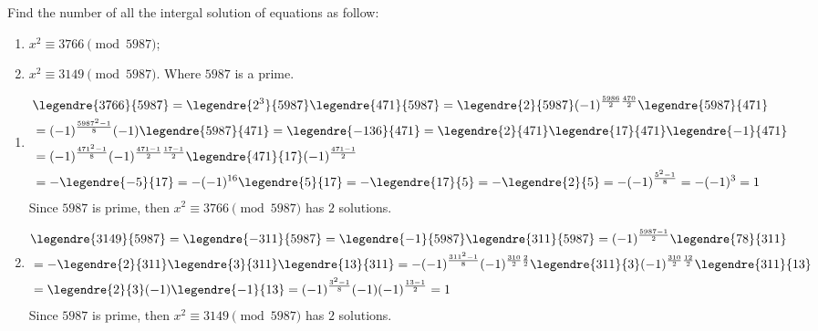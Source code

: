 \documentclass{ctexart}
\newif\ifpreface
\begin{document}
\large
\setlength{\baselineskip}{1.2em}
\ifpreface

\else
{}
\begin{problem}\label{pro:1}
  Find the number of all the intergal solution of equations as follow:
  \begin{enumerate}
    \item \(x^2 \equiv 3766 \pmod{5987}\);
    \item \(x^2 \equiv 3149 \pmod{5987}\).
      Where \(5987\) is a prime.
  \end{enumerate}
\end{problem}

\begin{solution}
  \begin{enumerate}
    \item
      \begin{equation}
        \begin{aligned}
           & \legendre{3766}{5987}=\legendre{2^3}{5987}\legendre{471}{5987}=\legendre{2}{5987}(-1)^{\frac{5986}{2} \frac{470}{2}}\legendre{5987}{471} \\
           & =(-1)^{\frac{5987^2-1}{8}} (-1)\legendre{5987}{471}=\legendre{-136}{471}=\legendre{2}{471}\legendre{17}{471}\legendre{-1}{471}           \\
           & =(-1)^{\frac{471^2-1}{8}}(-1)^{\frac{471-1}{2} \frac{17-1}{2}}\legendre{471}{17}(-1)^{\frac{471-1}{2}}                                   \\
           & =-\legendre{-5}{17}=-(-1)^{16}\legendre{5}{17}=-\legendre{17}{5}=-\legendre{2}{5}=-(-1)^{\frac{5^2-1}{8}}=-(-1)^3=1
        \end{aligned}
      \end{equation}
      Since \(5987\) is prime, then \(x^2 \equiv 3766 \pmod{5987}\) has \(2\) solutions.
    \item
      \begin{equation}
        \begin{aligned}
           & \legendre{3149}{5987}=\legendre{-311}{5987}=\legendre{-1}{5987}\legendre{311}{5987}=(-1)^{\frac{5987-1}{2}}\legendre{78}{311}                                                        \\
           & =-\legendre{2}{311}\legendre{3}{311}\legendre{13}{311}=-(-1)^{\frac{311^2-1}{8}}(-1)^{\frac{310}{2} \frac{2}{2}}\legendre{311}{3}(-1)^{\frac{310}{2} \frac{12}{2}}\legendre{311}{13} \\
           & =\legendre{2}{3}(-1)\legendre{-1}{13}=(-1)^{\frac{3^2-1}{8}}(-1)(-1)^{\frac{13-1}{2}}=1
        \end{aligned}
      \end{equation}
      Since \(5987\) is prime, then \(x^2 \equiv 3149 \pmod{5987}\) has \(2\) solutions.
  \end{enumerate}
\end{solution}
\end{document}
